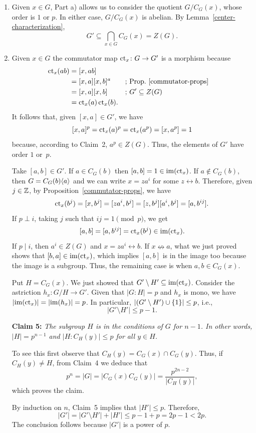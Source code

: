 \begin{solution}
\begin{enumerate}[\upshape a)]
    \item Given $x\in G$, Part a) allows us to consider the quotient $G/C_G(x)$, whose order is $1$ or $p$. In either case, $G/C_G(x)$ is abelian. By Lemma~\ref{center-characterization},
    $$
        G' \subseteq\bigcap_{x\in G}C_G(x) = Z(G).
    $$

    \item Given $x\in G$ the commutator map $\operatorname{\operatorname{ct}}_x\colon G\to G'$ is a morphism because
    \begin{align*}
        \operatorname{\operatorname{ct}}_x(ab) &= [x,ab]\\
            &= [x,a][x,b]^a  &&\text{; Prop.~\ref{commutator-props}}\\
            &= [x,a][x,b]   &&\text{; }G'\subseteq Z(G)\\
            &= \operatorname{\operatorname{ct}}_x(a)\operatorname{\operatorname{ct}}_x(b).
    \end{align*}
    It follows that, given $[x,a]\in G'$, we have
    $$
        [x,a]^p = \operatorname{\operatorname{ct}}_x(a)^p = \operatorname{\operatorname{ct}}_x(a^p)=[x,a^p]=1
    $$
    because, according to Claim~2, $a^p\in Z(G)$. Thus, the elements of $G'$ have order $1$ or~$p$.

    Take $[a,b]\in G'$. If $a\in C_G(b)$ then $[a,b]=1\in\operatorname{im}(\operatorname{\operatorname{ct}}_x)$. If $a\notin C_G(b)$, then $G=C_G(b)\langle a\rangle$ and we can write $x=za^i$ for some $z\leftrightarrow b$. Therefore, given $j\in\mathbb{Z}$, by Proposition~\ref{commutator-props}, we have
    $$
        \operatorname{\operatorname{ct}}_x(b^j) = [x,b^j] = [za^i,b^j] = [z,b^j][a^i,b^j]= [a,b^{ij}].
    $$
    If $p\perp i$, taking $j$ such that $ij=1\pmod p$, we get
    $$
        [a,b]=[a,b^{ij}]=\operatorname{\operatorname{ct}}_x(b^j)\in\operatorname{im}(\operatorname{\operatorname{ct}}_x).
    $$
    If $p\mid i$, then $a^i\in Z(G)$ and $x=za^i\leftrightarrow b$. If $x\nleftrightarrow a$, what we just proved shows that $[b,a]\in\operatorname{im}(\operatorname{\operatorname{ct}}_x)$, which implies $[a,b]$ is in the image too because the image is a subgroup. Thus, the remaining case is when $a,b\in C_G(x)$.
    
    Put $H=C_G(x)$. We just showed that $G'\setminus H'\subseteq\operatorname{im}(\operatorname{\operatorname{ct}}_x)$. Consider the astriction $h_x\colon G/H\to G'$. Given that $|G:H|=p$ and $h_x$ is mono, we have $|{\operatorname{im}(\operatorname{\operatorname{ct}}_x)}|=|{\operatorname{im}(h_x)}|=p$. In particular, $|(G' \setminus H')\cup\{1\}|\le p$, i.e.,
    $$
        |G'\setminus H'|\le p-1.
    $$

    \textbf{Claim 5:} \textit{The subgroup\/ $H$ is in the conditions of\/ $G$ for $n-1$. In other words, $|H|=p^{n-1}$ and\/ $|H:C_H(y)|\le p$ for all\/ $y\in H$.}

    To see this first observe that $C_H(y)=C_G(x)\cap C_G(y)$. Thus, if $C_H(y)\ne H$, from Claim~4 we deduce that
    $$
        p^n=|G|=|C_G(x)C_G(y)|=\frac{p^{2n-2}}{|C_H(y)|},
    $$
    which proves the claim.

    By induction on $n$, Claim~5 implies that $|H'|\le p$. Therefore,
    $$
        |G'|=|G'\setminus H'|+|H'|\le p-1 + p = 2p-1< 2p.
    $$
    The conclusion follows because $|G'|$ is a power of $p$.
\end{enumerate}
\end{solution}

